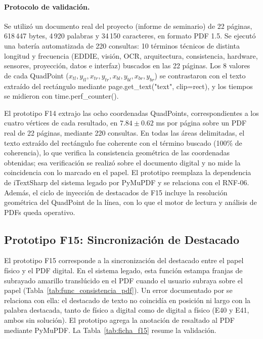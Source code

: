 \paragraph{Protocolo de validación.} Se utilizó un documento real del proyecto (informe de seminario) de 22 páginas, 618\,447 bytes, 4\,920 palabras y 34\,150 caracteres, en formato PDF 1.5. Se ejecutó una batería automatizada de 220 consultas: 10 términos técnicos de distinta longitud y frecuencia (EDDIE, visión, OCR, arquitectura, consistencia, hardware, sensores, proyección, datos e interfaz) buscados en las 22 páginas. Los 8 valores de cada QuadPoint ($x_{tl}, y_{tl}, x_{tr}, y_{tr}, x_{bl}, y_{bl}, x_{br}, y_{br}$) se contrastaron con el texto extraído del rectángulo mediante page.get\_text("text", clip=rect), y los tiempos se midieron con time.perf\_counter().
 
El prototipo F14 extrajo las ocho coordenadas QuadPoints, correspondientes a los cuatro vértices de cada resultado, en $7.84 \pm 0.62$ ms por página sobre un PDF real de 22 páginas, mediante 220 consultas. En todas las áreas delimitadas, el texto extraído del rectángulo fue coherente con el término buscado (100\% de coherencia), lo que verifica la consistencia geométrica de las coordenadas obtenidas; esa verificación se realizó sobre el documento digital y no mide la coincidencia con lo marcado en el papel. El prototipo reemplaza la dependencia de iTextSharp del sistema legado por PyMuPDF y se relaciona con el RNF-06. Además, el ciclo de inyección de destacados de F15 incluye la resolución geométrica del QuadPoint de la línea, con lo que el motor de lectura y análisis de PDFs queda operativo.
 
\subsection{Prototipo F15: Sincronización de Destacado}
 
El prototipo F15 corresponde a la sincronización del destacado entre el papel físico y el PDF digital. En el sistema legado, esta función estampa franjas de subrayado amarillo translúcido en el PDF cuando el usuario subraya sobre el papel (Tabla~\ref{tab:func_consistencia_pdf}). Un error documentado por \cite{ibaceta2023evaluacion} se relaciona con ella: el destacado de texto no coincidía en posición ni largo con la palabra destacada, tanto de físico a digital como de digital a físico (E40 y E41, ambos sin solución). El prototipo agrega la anotación de resaltado al PDF mediante PyMuPDF. La Tabla~\ref{tab:ficha_f15} resume la validación.
 

